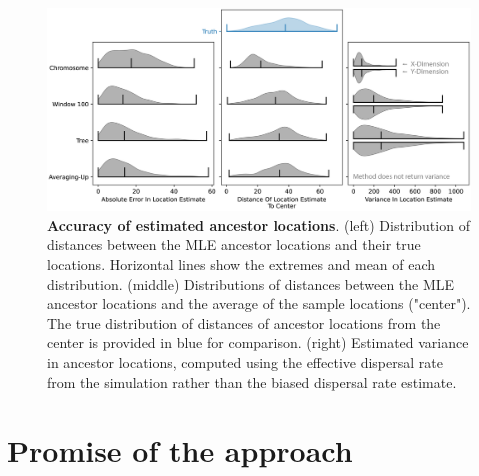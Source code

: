 \begin{figure}
    \centering
    \includegraphics[width=425px]{Images/Figure6_LocationAccuracy/Fig6.png}
    \caption{\textbf{Accuracy of estimated ancestor locations}. (left) Distribution of distances between the MLE ancestor locations and their true locations. Horizontal lines show the extremes and mean of each distribution. (middle) Distributions of distances between the MLE ancestor locations and the average of the sample locations ("center"). The true distribution of distances of ancestor locations from the center is provided in blue for comparison. (right) Estimated variance in ancestor locations, computed using the effective dispersal rate from the simulation rather than the biased dispersal rate estimate.}
    \label{fig:ancestral_locations_plots}
\end{figure}


\section{Promise of the approach}

